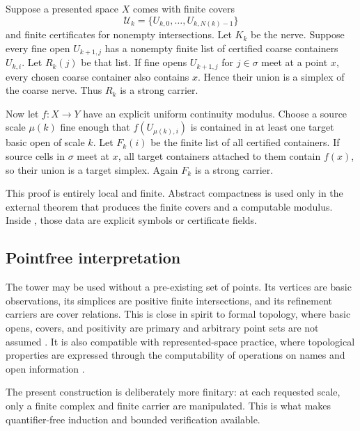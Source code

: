 Suppose a presented space $X$ comes with finite covers
\[
  \mathcal U_k=\{U_{k,0},\ldots,U_{k,N(k)-1}\}
\]
and finite certificates for nonempty intersections.  Let $K_k$ be the nerve.  Suppose every fine open $U_{k+1,j}$ has a nonempty finite list of certified coarse containers $U_{k,i}$.  Let $R_k(j)$ be that list.  If fine opens $U_{k+1,j}$ for $j\in\sigma$ meet at a point $x$, every chosen coarse container also contains $x$.  Hence their union is a simplex of the coarse nerve.  Thus $R_k$ is a strong carrier.

Now let $f:X\to Y$ have an explicit uniform continuity modulus.  Choose a source scale $\mu(k)$ fine enough that $f(U_{\mu(k),i})$ is contained in at least one target basic open of scale $k$.  Let $F_k(i)$ be the finite list of all certified containers.  If source cells in $\sigma$ meet at $x$, all target containers attached to them contain $f(x)$, so their union is a target simplex.  Again $F_k$ is a strong carrier.

This proof is entirely local and finite.  Abstract compactness is used only in the external theorem that produces the finite covers and a computable modulus.  Inside \ipra, those data are explicit symbols or certificate fields.

\subsection{Pointfree interpretation}

The tower may be used without a pre-existing set of points.  Its vertices are basic observations, its simplices are positive finite intersections, and its refinement carriers are cover relations.  This is close in spirit to formal topology, where basic opens, covers, and positivity are primary and arbitrary point sets are not assumed \cite{Sambin}.  It is also compatible with represented-space practice, where topological properties are expressed through the computability of operations on names and open information \cite{Pauly2016}.

The present construction is deliberately more finitary: at each requested scale, only a finite complex and finite carrier are manipulated.  This is what makes quantifier-free induction and bounded verification available.
